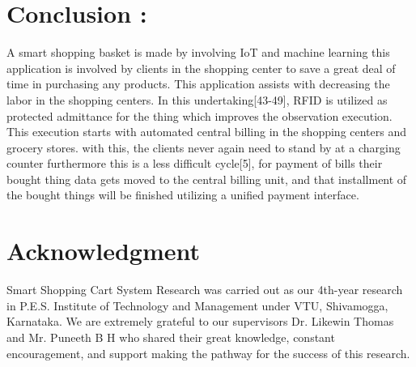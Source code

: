 \documentclass[conference]{IEEEtran}
\begin{document}
\section{Conclusion :}
A smart shopping basket is made by involving IoT and machine learning this application is involved by clients in the shopping center to save a great deal of time in purchasing any products. This application assists with decreasing the labor in the shopping centers. In this undertaking[43-49], RFID is utilized as protected admittance for the thing which improves the observation execution. This execution starts with automated central billing in the shopping centers and grocery stores. with this, the clients never again need to stand by at a charging counter furthermore this is a less difficult cycle[5], for payment of bills their bought thing data gets moved to the central billing unit, and that installment of the bought things will be finished utilizing a unified payment interface.\\


\section*{Acknowledgment}

Smart Shopping Cart System Research was carried out as our 4th-year research in P.E.S. Institute of Technology and Management under VTU, Shivamogga, Karnataka. We are extremely grateful to our supervisors Dr. Likewin Thomas and Mr. Puneeth B H who shared their great knowledge, constant encouragement, and support making the pathway for the success of this research.\\
\end{document}
